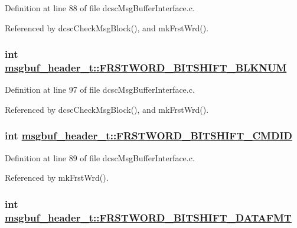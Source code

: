 Definition at line 88 of file dcsc\-Msg\-Buffer\-Interface.c.

Referenced by dcsc\-Check\-Msg\-Block(), and mk\-Frst\-Wrd().\hypertarget{structmsgbuf__header__t_51f61e787244c9002fba785687789bdb}{
\subsubsection[FRSTWORD\_\-BITSHIFT\_\-BLKNUM]{\setlength{\rightskip}{0pt plus 5cm}int \hyperlink{structmsgbuf__header__t_51f61e787244c9002fba785687789bdb}{msgbuf\_\-header\_\-t::FRSTWORD\_\-BITSHIFT\_\-BLKNUM}}}
\label{structmsgbuf__header__t_51f61e787244c9002fba785687789bdb}




Definition at line 97 of file dcsc\-Msg\-Buffer\-Interface.c.

Referenced by dcsc\-Check\-Msg\-Block(), and mk\-Frst\-Wrd().\hypertarget{structmsgbuf__header__t_5613d893ab652401624518811769c7f8}{
\subsubsection[FRSTWORD\_\-BITSHIFT\_\-CMDID]{\setlength{\rightskip}{0pt plus 5cm}int \hyperlink{structmsgbuf__header__t_5613d893ab652401624518811769c7f8}{msgbuf\_\-header\_\-t::FRSTWORD\_\-BITSHIFT\_\-CMDID}}}
\label{structmsgbuf__header__t_5613d893ab652401624518811769c7f8}




Definition at line 89 of file dcsc\-Msg\-Buffer\-Interface.c.

Referenced by mk\-Frst\-Wrd().\hypertarget{structmsgbuf__header__t_aa00d1cdea9a4385ded4fd62af6c3bd1}{
\subsubsection[FRSTWORD\_\-BITSHIFT\_\-DATAFMT]{\setlength{\rightskip}{0pt plus 5cm}int \hyperlink{structmsgbuf__header__t_aa00d1cdea9a4385ded4fd62af6c3bd1}{msgbuf\_\-header\_\-t::FRSTWORD\_\-BITSHIFT\_\-DATAFMT}}}
\label{structmsgbuf__header__t_aa00d1cdea9a4385ded4fd62af6c3bd1}




